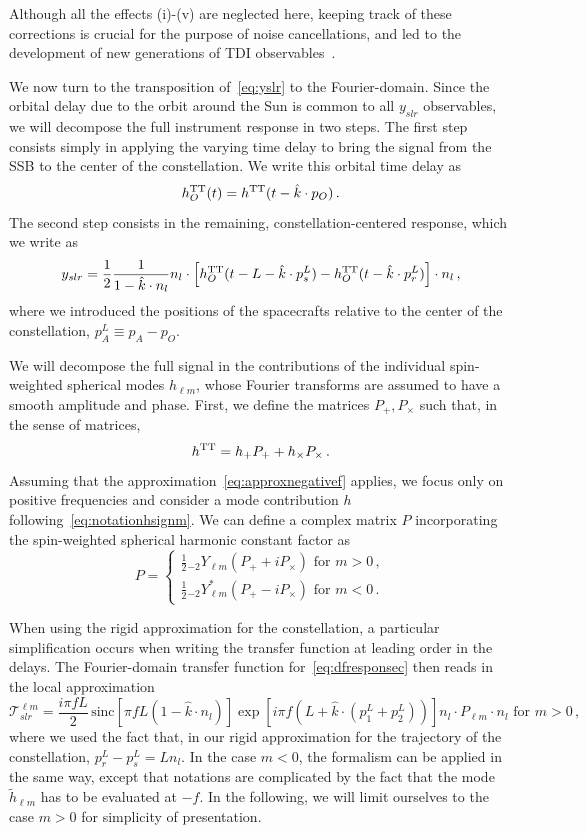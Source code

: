 \documentclass[aps,showpacs,%
prd,superscriptaddress,nofootinbib]{revtex4}
\newcommand{\be}{\begin{equation}}
\newcommand{\ee}{\end{equation}}
\newcommand\calT{{\mathcal{T}}}
\newcommand{\sinc}{\,\mathrm{sinc}}
\begin{document}
Although all the effects (i)-(v) are neglected here, keeping track of these corrections is crucial for the purpose of noise cancellations, and led to the development of new generations of TDI observables~\cite{}.

We now turn to the transposition of~\eqref{eq:yslr} to the Fourier-domain. Since the orbital delay due to the orbit around the Sun is common to all $y_{slr}$ observables, we will decompose the full instrument response in two steps. The first step consists simply in applying the varying time delay to bring the signal from the SSB to the center of the constellation. We write this orbital time delay as
\be\label{eq:defresponseO}
	h^{\rm TT}_{O} (t) = h^{\rm TT}(t-\hat{k}\cdot p_{O}) \,.
\ee
The second step consists in the remaining, constellation-centered response, which we write as
\be\label{eq:dfresponsec}
	y_{slr} = \frac{1}{2} \frac{1}{1 - \hat{k}\cdot n_{l}} n_{l}\cdot \left[ h_{O}^{\rm TT}(t - L - \hat{k}\cdot p^{L}_{s}) - h_{O}^{\rm TT}(t - \hat{k}\cdot p^{L}_{r}) \right] \cdot n_{l}\,,
\ee
where we introduced the positions of the spacecrafts relative to the center of the constellation, $p^{L}_{A} \equiv p_{A} - p_{O}$.

We will decompose the full signal in the contributions of the individual spin-weighted spherical modes $h_{\ell m}$, whose Fourier transforms are assumed to have a smooth amplitude and phase. First, we define the matrices $P_{+},P_{\times}$ such that, in the sense of matrices,
\be
	h^{\rm TT} = h_{+}P_{+} + h_{\times}P_{\times} \,.
\ee
Assuming that the approximation~\eqref{eq:approxnegativef} applies, we focus only on positive frequencies and consider a mode contribution $h$ following~\eqref{eq:notationhsignm}. We can define a complex matrix $P$ incorporating the spin-weighted spherical harmonic constant factor as
\be
	P = 
	\begin{cases} 
	\frac{1}{2} {}_{-2}Y_{\ell m} \left( P_{+} + i P_{\times} \right) \text{ for } m>0\,,\\
	\frac{1}{2} {}_{-2}Y_{\ell m}^{*} \left( P_{+} - i P_{\times} \right) \text{ for } m<0\,.
	\end{cases}
\ee

When using the rigid approximation for the constellation, a particular simplification occurs when writing the transfer function at leading order in the delays. The Fourier-domain transfer function for~\eqref{eq:dfresponsec} then reads in the local approximation
\be
	\calT_{slr}^{\ell m} = \frac{i \pi f L}{2} \sinc \left[ \pi f L\left(1-\hat{k}\cdot n_{l} \right) \right] \exp\left[ i \pi f \left( L + \hat{k}\cdot \left( p_{1}^{L} + p_{2}^{L} \right) \right) \right]  n_{l} \cdot P_{\ell m} \cdot n_{l} \text{ for } m>0 \,,
\ee
where we used the fact that, in our rigid approximation for the trajectory of the constellation, $p^{L}_{r} - p^{L}_{s} =  L n_{l}$. In the case $m<0$, the formalism can be applied in the same way, except that notations are complicated by the fact that the mode $\tilde{h}_{\ell m}$ has to be evaluated at $-f$. In the following, we will limit ourselves to the case $m>0$ for simplicity of presentation.
\end{document}

